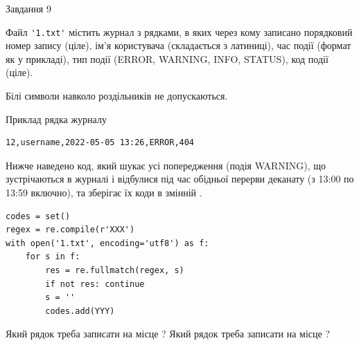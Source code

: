 \documentclass[12pt, ukrainian]{article}
\def\code#1{\Verb!#1!}
\begin{document}
{\begin{minipage}[t]{8.0cm}
\end{minipage}

               
{\begin{center}Завдання {9}\end{center}}
\vspace{-4mm}
Файл \code{'1.txt'} містить журнал з рядками, в яких через кому записано поряд\-ко\-вий номер запису (ціле), ім'я користувача (складається з латиниці), час події (фор\-мат як у прикладі), тип події (ERROR, WARNING, INFO, STATUS), код події (ціле).

Білі символи навколо роздільників не допускаються.

Приклад рядка журналу



\begin{verbatim}
12,username,2022-05-05 13:26,ERROR,404
\end{verbatim}


Нижче наведено код, який шукає усі попередження (подія WARNING), що зустрі\-ча\-ються в журналі і відбулися під час обідньої перерви деканату (з 13:00 по 13:59 включно), та зберігає їх коди в змінній .



\begin{verbatim}
codes = set()
regex = re.compile(r'XXX')
with open('1.txt', encoding='utf8') as f:
    for s in f:
        res = re.fullmatch(regex, s)
        if not res: continue
        s = ''
        codes.add(YYY)
\end{verbatim}





Який рядок треба записати на місце  ?
Який рядок треба записати на місце  ?\par

}
\newpage
\end{document}
